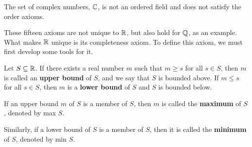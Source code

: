 \begin{note}
	The set of complex numbers, $\mathbb{C}$, is not an ordered field and does not satisfy the order axioms.
\end{note}

These fifteen axioms are not unique to $\mathbb{R}$, but also hold for $\mathbb{Q}$, as an example. What makes $\mathbb{R}$ unique is its completeness axiom. To define this axiom, we must first develop some tools for it.

\begin{definition}
	Let $S\subseteq\mathbb{R}$. If there exists a real number $m$ such that $m\geq s$ for all $s\in S$, then $m$ is called an \textbf{upper bound} of $S$, and we say that $S$ is bounded above. If $m\leq s$ for all $s\in S$, then $m$ is a \textbf{lower bound} of $S$ and $S$ is bounded below.
	
	If an upper bound $m$ of $S$ is a member of $S$, then $m$ is called the \textbf{maximum} of $S$, denoted by max $S$.
	
	Similarly, if a lower bound of $S$ is a member of $S$, then it is called the \textbf{minimum} of $S$, denoted by min $S$.
\end{definition}










































































